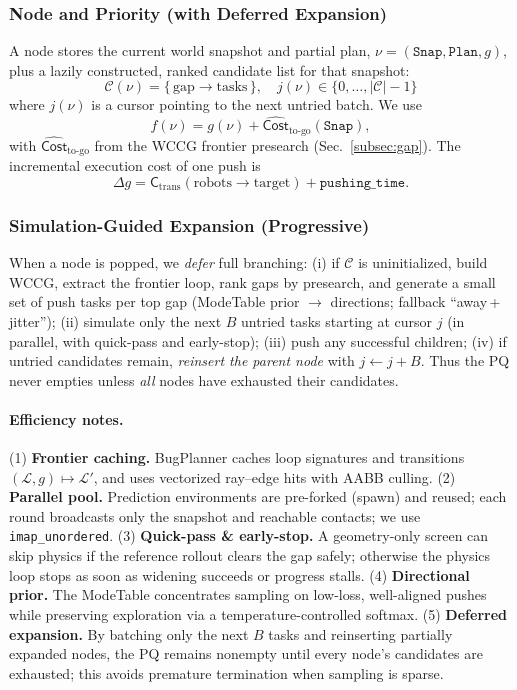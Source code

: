 \subsubsection{Node and Priority (with Deferred Expansion)}
\label{subsubsec:simloop-node}
A node stores the current world snapshot and partial plan, \(
\nu=(\texttt{Snap},\texttt{Plan},g)
\), plus a lazily constructed, ranked candidate list for that snapshot:
\[
\mathcal{C}(\nu)=\{\,\text{gap}\to\text{tasks}\,\},\quad
j(\nu)\in\{0,\dots,|\mathcal{C}|-1\}
\]
where \(j(\nu)\) is a cursor pointing to the next untried batch. We use
\begin{equation}\label{eq:simloop-priority}
  f(\nu)=g(\nu)+\widehat{\mathsf{Cost}}_{\text{to-go}}(\texttt{Snap}),
\end{equation}
with \(\widehat{\mathsf{Cost}}_{\text{to-go}}\) from the WCCG frontier presearch (Sec.~\ref{subsec:gap}). The incremental execution cost of one push is
\[
\Delta g=\mathsf{C}_{\mathrm{trans}}(\text{robots}\!\to\!\text{target})+\texttt{pushing\_time}.
\]

\subsubsection{Simulation-Guided Expansion (Progressive)}
\label{subsubsec:simloop-expansion}
When a node is popped, we \emph{defer} full branching: (i) if \(\mathcal{C}\) is uninitialized, build WCCG, extract the frontier loop, rank gaps by presearch, and generate a small set of push tasks per top gap (ModeTable prior $\rightarrow$ directions; fallback “away\,+\,jitter”); (ii) simulate only the next \(B\) untried tasks starting at cursor \(j\) (in parallel, with quick-pass and early-stop); (iii) push any successful children; (iv) if untried candidates remain, \emph{reinsert the parent node} with \(j\leftarrow j+B\). Thus the PQ never empties unless \emph{all} nodes have exhausted their candidates.


\paragraph{Efficiency notes.}
(1) \textbf{Frontier caching.} BugPlanner caches loop signatures and transitions $(\mathcal{L},g)\!\mapsto\!\mathcal{L}'$, and uses vectorized ray--edge hits with AABB culling.  
(2) \textbf{Parallel pool.} Prediction environments are pre-forked (spawn) and reused; each round broadcasts only the snapshot and reachable contacts; we use \texttt{imap\_unordered}.  
(3) \textbf{Quick-pass \& early-stop.} A geometry-only screen can skip physics if the reference rollout clears the gap safely; otherwise the physics loop stops as soon as widening succeeds or progress stalls.  
(4) \textbf{Directional prior.} The ModeTable concentrates sampling on low-loss, well-aligned pushes while preserving exploration via a temperature-controlled softmax.  
(5) \textbf{Deferred expansion.} By batching only the next \(B\) tasks and reinserting partially expanded nodes, the PQ remains nonempty until every node’s candidates are exhausted; this avoids premature termination when sampling is sparse.
